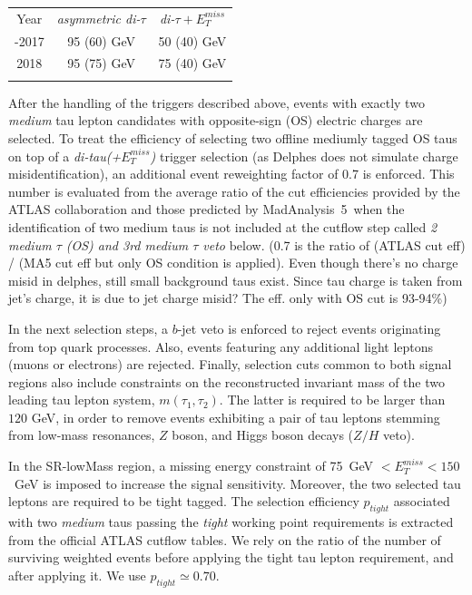 \documentclass{ws-mpla}
\newcommand{\madanalysis}{{\sc MadAnalysis~5}}
\begin{document}
\begin{table}[t]
  {\begin{tabular}{@{}c c c@{}} \toprule
  Year & \textit{asymmetric di-$\tau$} & \textit{di-$\tau +E^{miss}_T$} \\
  \colrule
 2015-2017 & 95 (60) GeV & 50 (40) GeV \\
 2018 & 95 (75) GeV & 75 (40) GeV \\ 
  \botrule
  \end{tabular}\label{tab:trig-eff} }
\end{table}

After the handling of the triggers described above, events with exactly two \textit{medium} tau lepton candidates with opposite-sign (OS) electric charges are selected. To treat the efficiency of selecting two offline mediumly tagged OS taus on top of a \textit{di-tau(+$E^{miss}_T$)} trigger selection (as {\sc Delphes} does not simulate charge misidentification), an additional event reweighting factor of 0.7 is enforced.
This number is evaluated from the average ratio of the cut efficiencies provided by the ATLAS collaboration and those predicted by \madanalysis\ when the identification of {\color{blue}two medium taus} is not included at the cutflow step called \textit{2 medium $\tau$ (OS) and 3rd medium $\tau$ veto} below.
{\color{blue}(0.7 is the ratio of (ATLAS cut eff) / (MA5 cut eff but only OS condition is applied). Even though there's no charge misid in delphes, still small background taus exist. Since tau charge is taken from jet's charge, it is due to jet charge misid? The eff. only with OS cut is 93-94\%)}

In the next selection steps, a $b$-jet veto is enforced to reject events originating from top quark processes.
Also, events featuring any additional light leptons (muons or electrons) are rejected.
Finally, selection cuts common to both signal regions also include constraints on the reconstructed invariant mass of the two leading tau lepton system, $m(\tau_1,\tau_2)$. The latter is required to be larger than $120$ GeV, in order to remove events exhibiting a pair of tau leptons stemming from low-mass resonances, $Z$ boson, and Higgs boson decays ($Z/H$ veto).

In the SR-lowMass region, a missing energy constraint of 75~GeV $< E^{miss}_T < 150$~GeV is imposed to increase the signal sensitivity. Moreover, the two selected tau leptons are required to be tight tagged.
The selection efficiency $p_{tight}$ associated with two {\it medium} taus passing the \textit{tight} working point requirements is extracted from the official ATLAS cutflow tables. We rely on the ratio of the number of surviving weighted events before applying the tight tau lepton requirement, and after applying it. We use $p_{tight}\simeq 0.70$.
\end{document}

